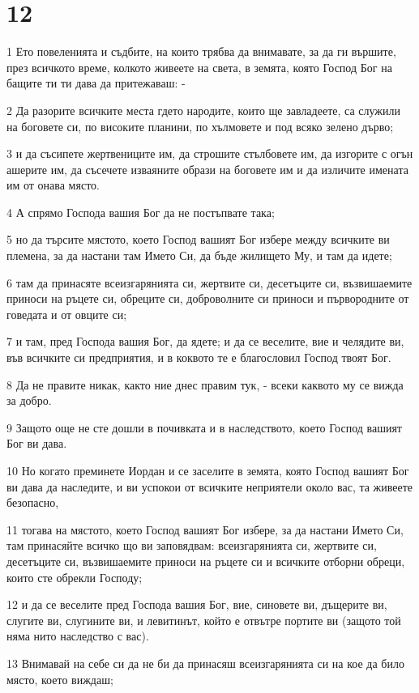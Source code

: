 \chapter{12}

\par 1 Ето повеленията и съдбите, на които трябва да внимавате, за да ги вършите, през всичкото време, колкото живеете на света, в земята, която Господ Бог на бащите ти ти дава да притежаваш: -
\par 2 Да разорите всичките места гдето народите, които ще завладеете, са служили на боговете си, по високите планини, по хълмовете и под всяко зелено дърво;
\par 3 и да съсипете жертвениците им, да строшите стълбовете им, да изгорите с огън ашерите им, да съсечете изваяните образи на боговете им и да изличите имената им от онава място.
\par 4 А спрямо Господа вашия Бог да не постъпвате така;
\par 5 но да търсите мястото, което Господ вашият Бог избере между всичките ви племена, за да настани там Името Си, да бъде жилището Му, и там да идете;
\par 6 там да принасяте всеизгарянията си, жертвите си, десетъците си, възвишаемите приноси на ръцете си, обреците си, доброволните си приноси и първородните от говедата и от овците си;
\par 7 и там, пред Господа вашия Бог, да ядете; и да се веселите, вие и челядите ви, във всичките си предприятия, и в коквото те е благословил Господ твоят Бог.
\par 8 Да не правите никак, както ние днес правим тук, - всеки каквото му се вижда за добро.
\par 9 Защото още не сте дошли в почивката и в наследството, което Господ вашият Бог ви дава.
\par 10 Но когато преминете Иордан и се заселите в земята, която Господ вашият Бог ви дава да наследите, и ви успокои от всичките неприятели около вас, та живеете безопасно,
\par 11 тогава на мястото, което Господ вашият Бог избере, за да настани Името Си, там принасяйте всичко що ви заповядвам: всеизгарянията си, жертвите си, десетъците си, възвишаемите приноси на ръцете си и всичките отборни обреци, които сте обрекли Господу;
\par 12 и да се веселите пред Господа вашия Бог, вие, синовете ви, дъщерите ви, слугите ви, слугините ви, и левитинът, който е отвътре портите ви (защото той няма нито наследство с вас).
\par 13 Внимавай на себе си да не би да принасяш всеизгарянията си на кое да било място, което виждаш;
